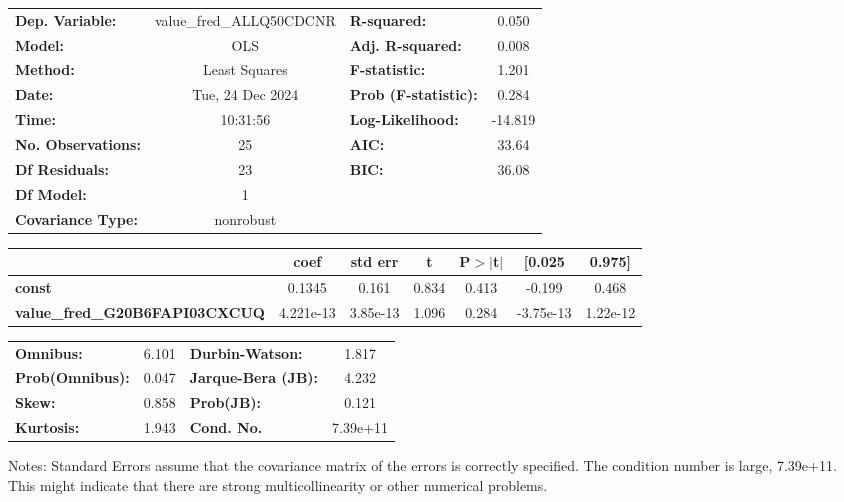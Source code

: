 \begin{center}
\begin{tabular}{lclc}
\toprule
\textbf{Dep. Variable:}                & value\_fred\_ALLQ50CDCNR & \textbf{  R-squared:         } &     0.050   \\
\textbf{Model:}                        &           OLS            & \textbf{  Adj. R-squared:    } &     0.008   \\
\textbf{Method:}                       &      Least Squares       & \textbf{  F-statistic:       } &     1.201   \\
\textbf{Date:}                         &     Tue, 24 Dec 2024     & \textbf{  Prob (F-statistic):} &    0.284    \\
\textbf{Time:}                         &         10:31:56         & \textbf{  Log-Likelihood:    } &   -14.819   \\
\textbf{No. Observations:}             &              25          & \textbf{  AIC:               } &     33.64   \\
\textbf{Df Residuals:}                 &              23          & \textbf{  BIC:               } &     36.08   \\
\textbf{Df Model:}                     &               1          & \textbf{                     } &             \\
\textbf{Covariance Type:}              &        nonrobust         & \textbf{                     } &             \\
\bottomrule
\end{tabular}
\begin{tabular}{lcccccc}
                                       & \textbf{coef} & \textbf{std err} & \textbf{t} & \textbf{P$> |$t$|$} & \textbf{[0.025} & \textbf{0.975]}  \\
\midrule
\textbf{const}                         &       0.1345  &        0.161     &     0.834  &         0.413        &       -0.199    &        0.468     \\
\textbf{value\_fred\_G20B6FAPI03CXCUQ} &    4.221e-13  &     3.85e-13     &     1.096  &         0.284        &    -3.75e-13    &     1.22e-12     \\
\bottomrule
\end{tabular}
\begin{tabular}{lclc}
\textbf{Omnibus:}       &  6.101 & \textbf{  Durbin-Watson:     } &    1.817  \\
\textbf{Prob(Omnibus):} &  0.047 & \textbf{  Jarque-Bera (JB):  } &    4.232  \\
\textbf{Skew:}          &  0.858 & \textbf{  Prob(JB):          } &    0.121  \\
\textbf{Kurtosis:}      &  1.943 & \textbf{  Cond. No.          } & 7.39e+11  \\
\bottomrule
\end{tabular}
\end{center}

Notes: \newline
 [1] Standard Errors assume that the covariance matrix of the errors is correctly specified. \newline
 [2] The condition number is large, 7.39e+11. This might indicate that there are \newline
 strong multicollinearity or other numerical problems.